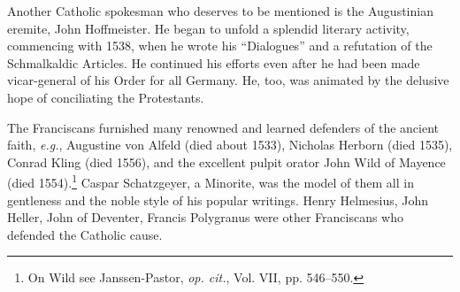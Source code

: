 Another Catholic spokesman who deserves to be mentioned is the
Augustinian eremite, John Hoffmeister. He began to unfold a splendid literary
activity, commencing with 1538, when he wrote his
“Dialogues” and a refutation of the Schmalkaldic Articles. He continued
his efforts even after he had been made vicar-general of his
Order for all Germany. He, too, was animated by the delusive hope
of conciliating the Protestants.

The Franciscans furnished many renowned and learned defenders
of the ancient faith, \textit{e.g.}, Augustine von Alfeld (died about 1533),
Nicholas Herborn (died 1535), Conrad Kling (died 1556), and the
excellent pulpit orator John Wild of Mayence (died 1554).\footnote{On Wild see Janssen-Pastor, \textit{op. cit.}, Vol. VII, pp. 546--550.}
 Caspar
Schatzgeyer, a Minorite, was the model of them all in gentleness and
the noble style of his popular writings. Henry Helmesius, John Heller,
John of Deventer, Francis Polygranus were other Franciscans who
defended the Catholic cause.

